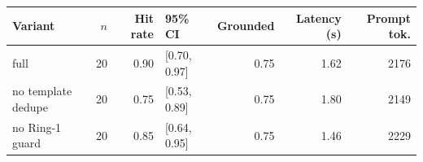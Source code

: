 \begin{tabular}{lrrlrrr}
\toprule
Variant & $n$ & Hit rate & 95\% CI & Grounded & Latency (s) & Prompt tok. \\
\midrule
full & 20 & 0.90 & [0.70, 0.97] & 0.75 & 1.62 & 2176 \\
no template dedupe & 20 & 0.75 & [0.53, 0.89] & 0.75 & 1.80 & 2149 \\
no Ring-1 guard & 20 & 0.85 & [0.64, 0.95] & 0.75 & 1.46 & 2229 \\
\bottomrule
\end{tabular}
